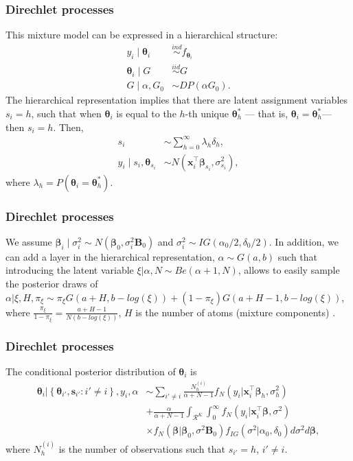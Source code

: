 \documentclass[12pt, compress]{beamer}
\begin{document}
\begin{frame}
	\frametitle{Direchlet processes}
This mixture model can be expressed in a hierarchical structure:
\begin{align*}
	y_i\mid \boldsymbol{\theta}_i & \stackrel{ind}{\sim}f_{\boldsymbol{\theta}_i}\\
	\boldsymbol{\theta}_i \mid G & \stackrel{iid}{\sim} G\\
	G \mid \alpha,G_0 & \sim DP(\alpha G_0).
\end{align*}
The hierarchical representation implies that there are latent assignment variables \( s_i = h \), such that when \( \boldsymbol{\theta}_i \) is equal to the \( h \)-th unique \( \boldsymbol{\theta}_h^* \) — that is, \( \boldsymbol{\theta}_i = \boldsymbol{\theta}_h^* \)— then \( s_i = h \). Then,
\begin{align*}
	s_i&\sim \sum_{h=0}^{\infty}\lambda_h\delta_h,\\
	y_i\mid s_i, \boldsymbol{\theta}_{s_i}&\sim N(\boldsymbol{x}_i^{\top}\boldsymbol{\beta}_{s_i},\sigma^2_{s_i}),
\end{align*} 
where $\lambda_h=P(\boldsymbol{\theta}_{i}=\boldsymbol{\theta}_{h}^*)$.
\end{frame}

\begin{frame}
	\frametitle{Direchlet processes}
We assume $\boldsymbol{\beta}_i\mid \sigma^2_i\sim N(\boldsymbol{\beta}_0, \sigma^2_i\boldsymbol{B}_0)$ and $\sigma_i^2\sim IG(\alpha_0/2,\delta_0/2)$. In addition, we can add a layer in the hierarchical representation, $\alpha\sim G(a,b)$ such that introducing the latent variable $\xi|\alpha,N\sim Be(\alpha+1,N)$, allows to easily sample the posterior draws of  $\alpha|\xi,H,\pi_{\xi}\sim\pi_{\xi}{G}(a+H,b-log(\xi))+(1-\pi_{\xi}){G}(a+H-1,b-log(\xi))$, where $\frac{\pi_{\xi}}{1-\pi_{\xi}}=\frac{a+H-1}{N(b-log(\xi))}$, $H$ is the number of atoms (mixture components) \citep{Escobar1995}.\end{frame}

\begin{frame}
	\frametitle{Direchlet processes}
The conditional posterior distribution of $\boldsymbol\theta_i$ is
\begin{align*}
	\boldsymbol\theta_i|\left\{\boldsymbol\theta_{i'},\boldsymbol s_{i'}:i'\neq i\right\}, y_i, \alpha & \sim \sum_{i'\neq i}\frac{N_h^{(i)}}{\alpha+N-1}f_N(y_i|\boldsymbol{x}_i^{\top}\boldsymbol{\beta}_h,\sigma_h^2)\\
	& +\frac{\alpha}{\alpha+N-1}\int_{\mathcal{R}^K}\int_{0}^{\infty}f_N(y_i|\boldsymbol{x}_i^{\top}\boldsymbol{\beta},\sigma^2)\\
	&\times f_N\left(\boldsymbol\beta\Big|\boldsymbol\beta_0,\sigma^2\boldsymbol B_0\right)f_{IG}(\sigma^2|\alpha_0,\delta_0)d\sigma^2 d\boldsymbol\beta,
\end{align*}
where $N_h^{(i)}$ is the number of observations such that $s_{i'}=h$, $i'\neq i$.
\end{frame}
\end{document}
